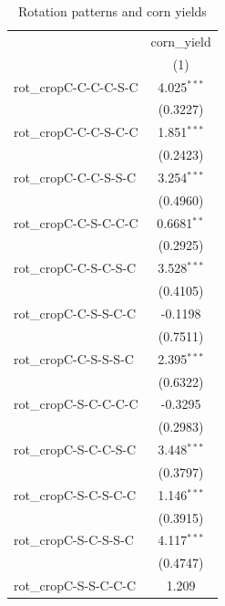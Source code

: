 
\begin{table}[htbp]
   \caption{\label{tab:table1} Rotation patterns and corn yields}
   \bigskip
   \centering
   \begin{tabular}{lc}
      \toprule
                                      & corn\_yield\\   
                                      & (1)\\  
      \midrule 
      rot\_cropC-C-C-C-S-C            & 4.025$^{***}$\\   
                                      & (0.3227)\\   
      rot\_cropC-C-C-S-C-C            & 1.851$^{***}$\\   
                                      & (0.2423)\\   
      rot\_cropC-C-C-S-S-C            & 3.254$^{***}$\\   
                                      & (0.4960)\\   
      rot\_cropC-C-S-C-C-C            & 0.6681$^{**}$\\   
                                      & (0.2925)\\   
      rot\_cropC-C-S-C-S-C            & 3.528$^{***}$\\   
                                      & (0.4105)\\   
      rot\_cropC-C-S-S-C-C            & -0.1198\\   
                                      & (0.7511)\\   
      rot\_cropC-C-S-S-S-C            & 2.395$^{***}$\\   
                                      & (0.6322)\\   
      rot\_cropC-S-C-C-C-C            & -0.3295\\   
                                      & (0.2983)\\   
      rot\_cropC-S-C-C-S-C            & 3.448$^{***}$\\   
                                      & (0.3797)\\   
      rot\_cropC-S-C-S-C-C            & 1.146$^{***}$\\   
                                      & (0.3915)\\   
      rot\_cropC-S-C-S-S-C            & 4.117$^{***}$\\   
                                      & (0.4747)\\   
      rot\_cropC-S-S-C-C-C            & 1.209\\   

\end{tabular}
\end{table}
